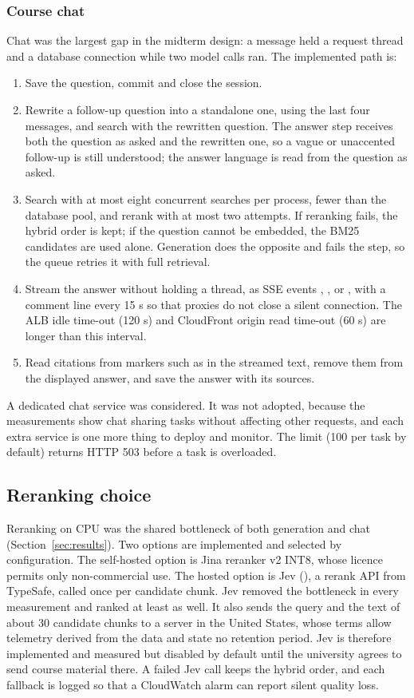 \subsubsection{Course chat}
Chat was the largest gap in the midterm design: a message held a request thread and a database connection while two model calls ran. The implemented path is:
\begin{enumerate}[nosep]
\item Save the question, commit and close the session.
\item Rewrite a follow-up question into a standalone one, using the last four messages, and search with the rewritten question. The answer step receives both the question as asked and the rewritten one, so a vague or unaccented follow-up is still understood; the answer language is read from the question as asked.
\item Search with at most eight concurrent searches per process, fewer than the database pool, and rerank with at most two attempts. If reranking fails, the hybrid order is kept; if the question cannot be embedded, the BM25 candidates are used alone. Generation does the opposite and fails the step, so the queue retries it with full retrieval.
\item Stream the answer without holding a thread, as SSE events , ,  or , with a comment line every 15 s so that proxies do not close a silent connection. The ALB idle time-out (120 s) and CloudFront origin read time-out (60 s) are longer than this interval.
\item Read citations from markers such as \code{[S2]} in the streamed text, remove them from the displayed answer, and save the answer with its sources.
\end{enumerate}
A dedicated chat service was considered. It was not adopted, because the measurements show chat sharing  tasks without affecting other requests, and each extra service is one more thing to deploy and monitor. The limit  (100 per task by default) returns HTTP 503 before a task is overloaded.
\subsection{Reranking choice}\label{sec:rerank-choice}
Reranking on CPU was the shared bottleneck of both generation and chat (Section~\ref{sec:results}). Two options are implemented and selected by configuration. The self-hosted option is Jina reranker v2 INT8, whose licence permits only non-commercial use. The hosted option is Jev (), a rerank API from TypeSafe, called once per candidate chunk. Jev removed the bottleneck in every measurement and ranked at least as well. It also sends the query and the text of about 30 candidate chunks to a server in the United States, whose terms allow telemetry derived from the data and state no retention period. Jev is therefore implemented and measured but disabled by default until the university agrees to send course material there. A failed Jev call keeps the hybrid order, and each fallback is logged so that a CloudWatch alarm can report silent quality loss.
